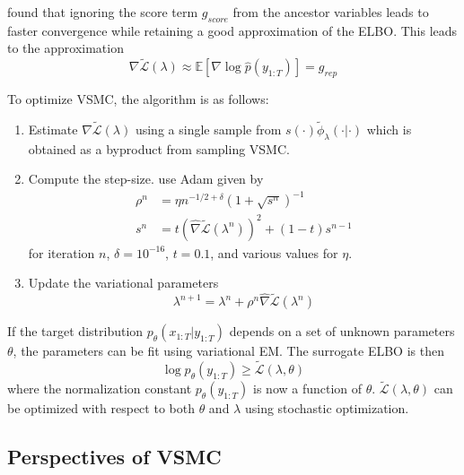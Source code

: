 \documentclass{article}
\begin{document}
\textcite{Naesseth:2018} found that ignoring the score term $g_{score}$ from the ancestor variables leads to faster convergence while retaining a good approximation of the ELBO. This leads to the approximation
\[
\nabla\tilde{\mathcal{L}}(\lambda) \approx \mathbb{E}[\nabla\log\hat{p}(y_{1:T})] = g_{rep}
\]

To optimize VSMC, the algorithm is as follows:
\begin{enumerate}

\item
Estimate $\nabla\tilde{\mathcal{L}}(\lambda)$ using a single sample from $s(\cdot)\tilde{\phi}_\lambda(\cdot|\cdot)$ which is obtained as a byproduct from sampling VSMC.

\item
Compute the step-size. \textcite{Naesseth:2018} use Adam given by
\begin{align*}
\rho^n &= \eta n^{-1/2+\delta}(1+\sqrt{s^n})^{-1} \\
s^n &= t\left(\hat{\nabla}\tilde{\mathcal{L}}(\lambda^n)\right)^2+(1-t)s^{n-1}
\end{align*}
for iteration $n$, $\delta=10^{-16}$, $t=0.1$, and various values for $\eta$.

\item
Update the variational parameters
\[
\lambda^{n+1} = \lambda^n+\rho^n\hat{\nabla}\tilde{\mathcal{L}}(\lambda^n)
\]

\end{enumerate}

If the target distribution $p_\theta(x_{1:T}|y_{1:T})$ depends on a set of unknown parameters $\theta$, the parameters can be fit using variational EM. The surrogate ELBO is then
\[
\log p_\theta(y_{1:T}) \geq \tilde{\mathcal{L}}(\lambda,\theta)
\]
where the normalization constant $p_\theta(y_{1:T})$ is now a function of $\theta$. $\tilde{\mathcal{L}}(\lambda,\theta)$ can be optimized with respect to both $\theta$ and $\lambda$ using stochastic optimization.


\subsection{Perspectives of VSMC}
\end{document}
